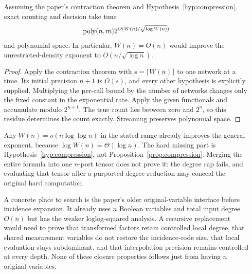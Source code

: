 \begin{proposition}\label{prop:compression}
Assuming the paper's contraction theorem and Hypothesis~\ref{hyp:compression}, exact counting and decision take time
\[
 \operatorname{poly}(n,m)2^{O(W(n)/\sqrt{\log W(n)})}
\]
and polynomial space. In particular, $W(n)=O(n)$ would improve the unrestricted-density exponent to $O(n/\sqrt{\log n})$.
\end{proposition}
\begin{proof}
Apply the contraction theorem with $s=\lceil W(n)\rceil$ to one network at a time. Its initial precision $n+1$ is $O(s)$, and every other hypothesis is explicitly supplied. Multiplying the per-call bound by the number of networks changes only the fixed constant in the exponential rate. Apply the given functionals and accumulate modulo $2^{n+1}$. The true count lies between zero and $2^n$, so this residue determines the count exactly. Streaming preserves polynomial space.
\end{proof}

Any $W(n)=o(n\log\log n)$ in the stated range already improves the general exponent, because $\log W(n)=\Theta(\log n)$. The hard missing part is Hypothesis~\ref{hyp:compression}, not Proposition~\ref{prop:compression}. Merging the entire formula into one $n$-port tensor does not prove it: the degree cap fails, and evaluating that tensor after a purported degree reduction may conceal the original hard computation.

A concrete place to search is the paper's older original-variable interface before incidence expansion. It already uses $n$ Boolean variables and total input degree $O(n)$ but has the weaker loglog-squared analysis. A recursive replacement would need to prove that transformed factors retain controlled local degree, that shared measurement variables do not restore the incidence-code size, that local evaluation stays subdominant, and that interpolation precision remains controlled at every depth. None of these closure properties follows just from having $n$ original variables.

